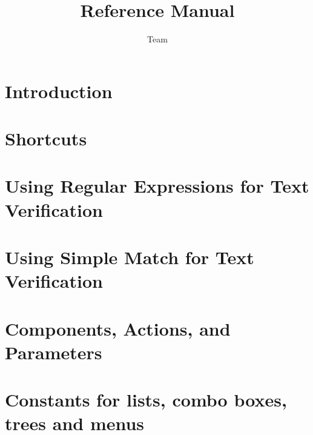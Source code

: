 \documentclass[en,a4paper,twoside,manual,guidancer]{bxreport}
\begin{document}
\title{\app{} Reference Manual}
\author*{\app{} Team}{}
\maketitle

\tableofcontents
\renewcommand{\bxcomment}[2]{}%
\clearpage

\chapter{Introduction}

\clearpage

\chapter{Shortcuts}

\clearpage

\chapter{Using Regular Expressions for Text Verification}
\label{regex}

\clearpage

\chapter{Using Simple Match for Text Verification}
\label{simplematch}

\clearpage

\chapter{Components, Actions, and Parameters}
 \label{actparam}
 
 \clearpage

\chapter{Constants for lists, combo boxes, trees and menus}
\label{constants}

\clearpage
\end{document}
